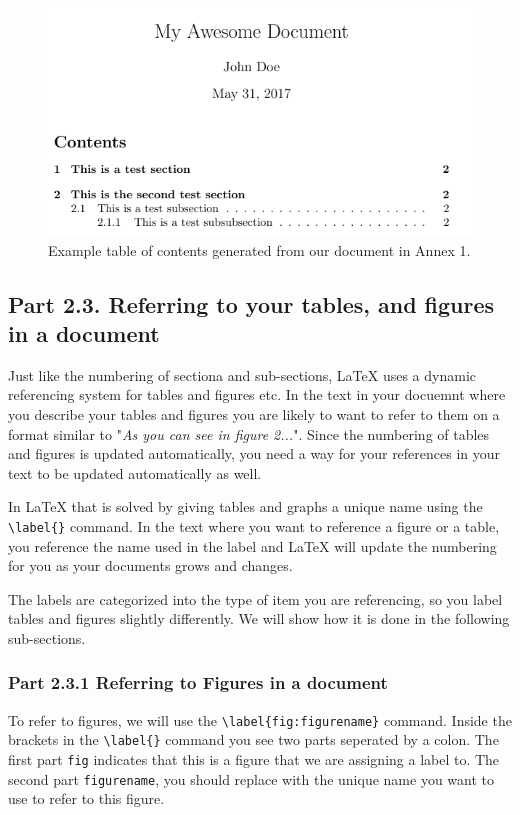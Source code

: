 \documentclass[12pts]{report}
\begin{document}
\begin{figure} [H]
	\centering
	\includegraphics[width=.8\linewidth]{../img/tableofcontents2}
	\caption{Example table of contents generated from our document in Annex 1.}
	\label{fig:tableofcontents}
\end{figure}

\subsection*{Part 2.3. Referring to your tables, and figures in a document}

Just like the numbering of sectiona and sub-sections, {\LaTeX} uses a dynamic referencing system for tables and figures etc. In the text in your docuemnt where you describe your tables and figures you are likely to want to refer to them on a format similar to "\textit{As you can see in figure 2...}". Since the numbering of tables and figures is updated automatically, you need a way for your references in your text to be updated automatically as well.

In {\LaTeX} that is solved by giving tables and graphs a unique name using the \verb|\label{}| command. In the text where you want to reference a figure or a table, you reference the name used in the label and {\LaTeX} will update the numbering for you as your documents grows and changes.

The labels are categorized into the type of item you are referencing, so you label tables and figures slightly differently. We will show how it is done in the following sub-sections.

\subsubsection*{Part 2.3.1 Referring to Figures in a document}
To refer to figures, we will use the \verb|\label{fig:figurename}| command. Inside the brackets in the \verb|\label{}| command you see two parts seperated by a colon. The first part  \texttt{fig} indicates that this is a figure that we are assigning a label to. The second part  \texttt{figurename}, you should replace with the unique name you want to use to refer to this figure.
  
\end{document}

